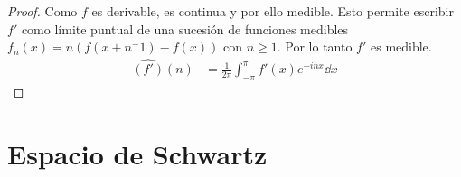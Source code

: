 \documentclass{article}
\theoremstyle{remark}
\begin{document}

\begin{proof}
  Como \(f\) es derivable, es continua y por ello medible.
  Esto permite escribir \(f'\) como límite puntual de una sucesión de funciones medibles \(f_n(x) = n (f(x + n^-1) - f(x))\) con \(n \geq 1\).
  Por lo tanto \(f'\) es medible.
  \begin{align}
    \widehat{(f')}(n)
    &=
    \frac{1}{2 \pi} \int_{- \pi}^{\pi} f'(x) e^{- i n x} \dd x
  \end{align}
\end{proof}

\section{Espacio de Schwartz}
\end{document}
